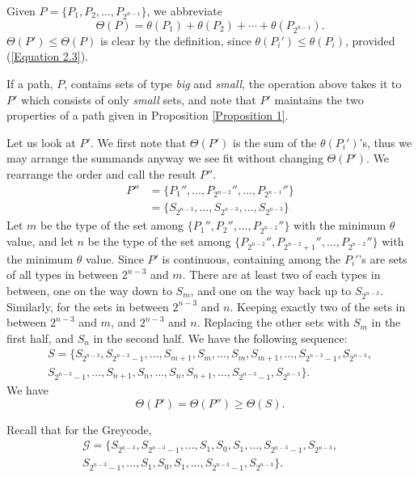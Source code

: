 \documentclass[12pt]{ucthesis}
\theoremstyle{plain}
\theoremstyle{definition}
\begin{document}
Given $P = \{P_1, P_2, \dots, P_{2^{n - 1}}\}$, we abbreviate
\begin{equation*}
\Theta(P) = \theta(P_1) + \theta(P_2) + \cdots + \theta(P_{2^{n - 1}}).
\end{equation*}
$\Theta(P') \le \Theta(P)$ is clear by the definition,
since $\theta(P_i') \le \theta(P_i)$, provided (\ref{Equation 2.3}).

If a path, $P$, contains sets of type \emph{big} and \emph{small},
the operation above takes it to $P'$ which consists of only \emph{small} sets,
and note that $P'$ maintains the two properties of a path given in Proposition \ref{Proposition 1}.

Let us look at $P'$.
We first note that $\Theta(P')$ is the sum of the $\theta(P_i')$'s,
thus we may arrange the summands anyway we see fit without changing $\Theta(P')$.
We rearrange the order and call the result $P''$.
\begin{align*}
P'' & = \{P_1'', \dots, P_{2^{n - 2}}'', \dots, P_{2^{n - 1}}''\} \\
    & = \{S_{2^{n - 3}}, \dots, S_{2^{n - 3}}, \dots, S_{2^{n - 3}}\}
\end{align*}
Let $m$ be the type of the set among $\{P_1'', P_2'', \dots, P_{2^{n - 2}}''\}$
with the minimum $\theta$ value,
and let $n$ be the type of the set among $\{P_{2^{n - 2}}'', P_{2^{n - 2} + 1}'', \dots, P_{2^{n - 2}}''\}$
with the minimum $\theta$ value.
Since $P'$ is continuous,
containing among the $P_i'$'s are sets of all types in between $2^{n - 3}$ and $m$.
There are at least two of each types in between,
one on the way down to $S_m$, and one on the way back up to $S_{2^{n - 3}}$.
Similarly, for the sets in between $2^{n - 3}$ and $n$.
Keeping exactly two of the sets in between $2^{n - 3}$ and $m$, and $2^{n - 3}$ and $n$.
Replacing the other sets with $S_m$ in the first half, and $S_n$ in the second half.
We have the following sequence:
\begin{align*}
S = \{S_{2^{n - 3}}, S_{2^{n - 3} - 1}, \dots, S_{m + 1}, S_m, \dots, S_m, S_{m + 1},
\dots, S_{2^{n - 3} - 1}, S_{2^{n - 3}}, \\
S_{2^{n - 3} - 1}, \dots, S_{n + 1}, S_n,
\dots, S_n, S_{n + 1}, \dots, S_{2^{n - 3} - 1}, S_{2^{n - 3}}\}.
\end{align*}
We have
\begin{equation*}
\Theta(P') = \Theta(P'') \ge \Theta(S).
\end{equation*}

Recall that for the Greycode,
\begin{align*}
\mathcal{G} = \{S_{2^{n - 3}}, S_{2^{n - 3} - 1}, \dots, S_1, S_0, S_1,
\dots, S_{2^{n - 3} - 1}, S_{2^{n - 3}}, \\
S_{2^{n - 3} - 1}, \dots, S_1, S_0, S_1, \dots, S_{2^{n - 3} - 1}, S_{2^{n - 3}}\}.
\end{align*}
\end{document}
